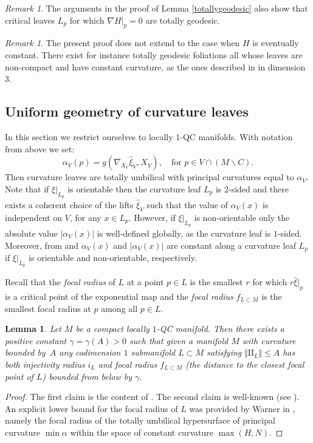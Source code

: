 \documentclass[JEP,XML,SOM,Unicode]{cedram}
\let\moins\smallsetminus
\newcommand{\II}{\mathrm{II}}
\let\parallel\Vert
\newtheorem{lemma}[theorem]{Lemma}
\theoremstyle{definition}
\theoremstyle{remark}
\newtheorem{remark}[theorem]{Remark}
\numberwithin{equation}{section}
\begin{document}
\begin{remark}
The arguments in the proof of Lemma \ref{totallygeodesic}
also show that critical leaves $L_p$ for which
$\nabla H|_p=0$ are totally geodesic.
\end{remark}

\begin{remark}
The present proof does not extend to the case when $H$ is eventually constant. There exist
for instance totally geodesic foliations all whose leaves are non-compact and have constant
curvature, as the ones described in \cite{Car-Ghys} in dimension $3$.
\end{remark}

\subsection{Uniform geometry of curvature leaves}\label{Uniformgeom}
In this section we restrict ourselves to locally $1$-QC manifolds.
With notation from above we set:
\[ \alpha_V(p)=g(\nabla_{X_V}\widehat{\xi}_V, X_V), \quad\text{for }  p\in V\cap (M\moins C).\]
Then curvature leaves are totally umbilical with principal curvatures equal to $\alpha_V$.
Note that if $\xi|_{L_p}$ is orientable then the curvature leaf $L_p$ is $2$-sided and there exists a coherent choice of the lifts $\widehat{\xi}_V$ such that the value of $\alpha_V(x)$ is independent on $V$, for any $x\in L_p$.
However, if $\xi|_{L_p}$ is non-orientable only the absolute value $|\alpha_V(x)|$ is well-defined globally,
as the curvature leaf is $1$-sided. Moreover, from \cite[(3.5)]{BP} and \cite[(3.4-3.5)(i)]{GM}
$\alpha_V(x)$ and $|\alpha_V(x)|$ are constant along a curvature leaf
$L_p$ if $\xi|_{L_p}$ is orientable and non-orientable, respectively.

Recall that the \emph{focal radius} of $L$ at a point $p\in L$ is the smallest $r$ for which $r\widehat{\xi}|_p$
is a critical point of the exponential map and the \emph{focal radius} $f_{L\subset M}$ is the smallest focal radius at $p$ among all $p\in L$.

\begin{lemma}\label{injectivity}
Let $M$ be a compact locally $1$-QC manifold. Then
there exists a positive constant $\gamma=\gamma(A)>0$ such that
given a manifold $M$ with curvature bounded by~$A$ any codimension $1$ submanifold $L\subset M$ satisfying $\parallel \II_{L} \parallel \leq A$ has both injectivity radius $i_L$ and focal radius $f_{L\subset M}$ (\ie the distance to the closest focal point of $L$)
bounded from below by $\gamma$.
\end{lemma}
\begin{proof}
The first claim is the content of \cite[Lem.\,3]{FG1}. The second claim is well-known (see \cite[Lem.\,2.3]{FG2}).
An explicit lower bound for the focal radius of $L$ was provided by Warner in \cite[Cor.\,4.2]{War}, namely the focal radius of the totally umbilical
hypersurface of principal curvature $\min \alpha$ within the space
of constant curvature $\max(H,N)$.
\end{proof}
\end{document}
